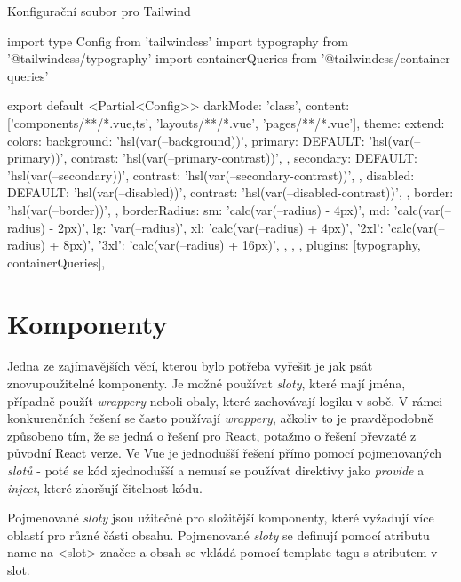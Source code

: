 \begin{listing}[H]
    \caption{Konfigurační soubor pro Tailwind}
    \label{lst:tailwind-config}
    \begin{code}
import type { Config } from 'tailwindcss'
import typography from '@tailwindcss/typography'
import containerQueries from '@tailwindcss/container-queries'

export default <Partial<Config>>{
    darkMode: 'class',
    content: ['components/**/*.{vue,ts}', 'layouts/**/*.vue', 'pages/**/*.vue'],
    theme: {
        extend: {
            colors: {
                background: 'hsl(var(--background))',
                primary: {
                    DEFAULT: 'hsl(var(--primary))',
                    contrast: 'hsl(var(--primary-contrast))',
                },
                secondary: {
                    DEFAULT: 'hsl(var(--secondary))',
                    contrast: 'hsl(var(--secondary-contrast))',
                },
                disabled: {
                    DEFAULT: 'hsl(var(--disabled))',
                    contrast: 'hsl(var(--disabled-contrast))',
                },
                border: 'hsl(var(--border))',
            },
            borderRadius: {
                sm: 'calc(var(--radius) - 4px)',
                md: 'calc(var(--radius) - 2px)',
                lg: 'var(--radius)',
                xl: 'calc(var(--radius) + 4px)',
                '2xl': 'calc(var(--radius) + 8px)',
                '3xl': 'calc(var(--radius) + 16px)',
            },
        },
    },
    plugins: [typography, containerQueries],
}
\end{code}
\end{listing}

\section{Komponenty}
Jedna ze zajímavějších věcí, kterou bylo potřeba vyřešit je jak psát znovupoužitelné komponenty. Je možné používat \emph{sloty}, které mají jména, případně použít \emph{wrappery} neboli obaly, které zachovávají logiku v sobě. V rámci konkurenčních řešení se často používají \emph{wrappery}, ačkoliv to je pravděpodobně způsobeno tím, že se jedná o řešení pro React, potažmo o řešení převzaté z původní React verze. Ve Vue je jednodušší řešení přímo pomocí pojmenovaných \emph{slotů} - poté se kód zjednodušší a nemusí se používat direktivy jako \emph{provide} a \emph{inject}, které zhoršují čitelnost kódu.

Pojmenované \emph{sloty} jsou užitečné pro složitější komponenty, které vyžadují více oblastí pro různé části obsahu. Pojmenované \emph{sloty} se definují pomocí atributu name na <slot> značce a obsah se vkládá pomocí template tagu s atributem v-slot.

